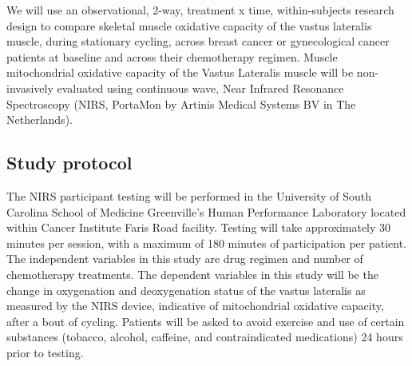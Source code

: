 \documentclass[
]{book}
\begin{document}
We will use an observational, 2-way, treatment x time, within-subjects research design to compare skeletal muscle oxidative capacity of the vastus lateralis muscle, during stationary cycling, across breast cancer or gynecological cancer patients at baseline and across their chemotherapy regimen. Muscle mitochondrial oxidative capacity of the Vastus Lateralis muscle will be non-invasively evaluated using continuous wave, Near Infrared Resonance Spectroscopy (NIRS, PortaMon by Artinis Medical Systems BV in The Netherlands).

\hypertarget{Appendix-IRB-Protocol-StudyProtocol}{%
\subsection{Study protocol}\label{Appendix-IRB-Protocol-StudyProtocol}}

The NIRS participant testing will be performed in the University of South Carolina School of Medicine Greenville's Human Performance Laboratory located within Cancer Institute Faris Road facility. Testing will take approximately 30 minutes per session, with a maximum of 180 minutes of participation per patient. The independent variables in this study are drug regimen and number of chemotherapy treatments. The dependent variables in this study will be the change in oxygenation and deoxygenation status of the vastus lateralis as measured by the NIRS device, indicative of mitochondrial oxidative capacity, after a bout of cycling. Patients will be asked to avoid exercise and use of certain substances (tobacco, alcohol, caffeine, and contraindicated medications) 24 hours prior to testing.
\end{document}
